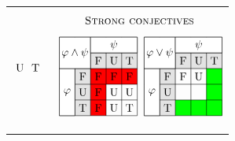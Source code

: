 \documentclass[xcolor=x11names]{beamer}
\begin{document}
\begin{frame}
\begin{tabular}{cc}
\begin{minipage}{5.2cm}
\[\begin{tikzpicture}[scale=.5]
\node at (2.5,-3.5) {U};
\node at (3.5,-3.5) {T};
\end{tikzpicture}\]
\end{minipage}%
&\pause%
\begin{minipage}{5.2cm}
\[\textsc{Strong conjectives}\]
\[\begin{tikzpicture}[scale=.5]
\begin{scope}[red]
\fill  (2,-1) rectangle (1,-4);
\fill  (1,-2) rectangle (4,-1);
\end{scope}
\node at (0,0){};
\draw [step=1cm] (-1,-4) node (v1) {} grid (4,1);
\draw[fill=white]  (v1) rectangle (0,-1);
\draw[fill=white]  (-1,1) rectangle (1,-1) node (v2) {};
\draw[fill=white]  (1,1) rectangle (4,0);
\draw[fill=black, opacity=.1]  (v2) node (v3) {} rectangle (4,0);
\draw[fill=black, opacity=.1]  (v3) rectangle (0,-4);
\node at (0,0) {$\varphi\land \psi$};
\node at (-0.5,-2.5) {$\varphi$};
\node at (2.5,0.5) {$\psi$};
\node at (0.5,-1.5) {F};
\node at (0.5,-2.5) {U};
\node at (0.5,-3.5) {T};
\node at (1.5,-0.5) {F};
\node at (2.5,-0.5) {U};
\node at (3.5,-0.5) {T};
\node at (1.5,-1.5) {F};
\node at (2.5,-1.5) {F};
\node at (3.5,-1.5) {F};
\node at (1.5,-2.5) {F};
\node at (2.5,-2.5) {U};
\node at (3.5,-2.5) {U};
\node at (1.5,-3.5) {F};
\node at (2.5,-3.5) {U};
\node at (3.5,-3.5) {T};
\end{tikzpicture}
\; %
\begin{tikzpicture}[scale=.5]
\begin{scope}[green]
\fill  (4,-1) rectangle (3,-4);
\fill  (1,-4) rectangle (4,-3);
\end{scope}
\node at (0,0){};
\draw [step=1cm] (-1,-4) node (v1) {} grid (4,1);
\draw[fill=white]  (v1) rectangle (0,-1);
\draw[fill=white]  (-1,1) rectangle (1,-1) node (v2) {};
\draw[fill=white]  (1,1) rectangle (4,0);
\draw[fill=black, opacity=.1]  (v2) node (v3) {} rectangle (4,0);
\draw[fill=black, opacity=.1]  (v3) rectangle (0,-4);
\node at (0,0) {$\varphi\lor \psi$};
\node at (-0.5,-2.5) {$\varphi$};
\node at (2.5,0.5) {$\psi$};
\node at (0.5,-1.5) {F};
\node at (0.5,-2.5) {U};
\node at (0.5,-3.5) {T};
\node at (1.5,-0.5) {F};
\node at (2.5,-0.5) {U};
\node at (3.5,-0.5) {T};
\node at (1.5,-1.5) {F};
\node at (2.5,-1.5) {U};

\end{tikzpicture}\]
\end{minipage}
\end{tabular}
\end{frame}
\end{document}
